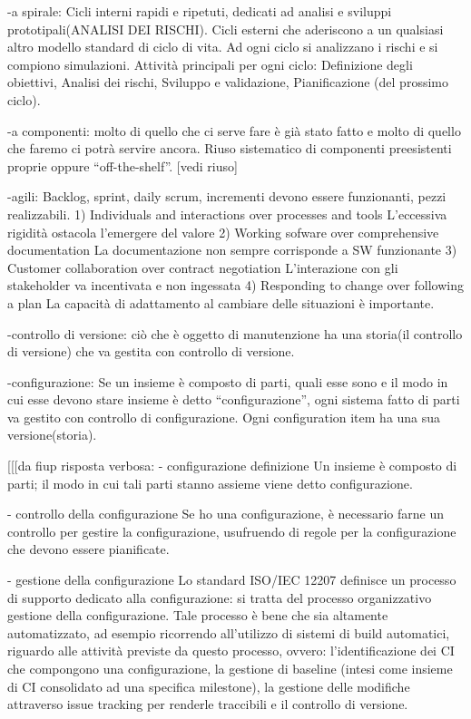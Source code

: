 \documentclass{report}
\begin{document}
-a spirale: Cicli interni rapidi e ripetuti, dedicati ad analisi e sviluppi prototipali(ANALISI DEI RISCHI). Cicli esterni che aderiscono a un qualsiasi altro modello standard di ciclo di vita. Ad ogni ciclo si analizzano i rischi e si compiono simulazioni. 
Attività principali per ogni ciclo: Definizione degli obiettivi, Analisi dei rischi, Sviluppo e validazione, Pianificazione (del prossimo ciclo).

-a componenti: molto di quello che ci serve fare è già stato fatto e molto di quello che faremo ci potrà servire ancora. Riuso sistematico di componenti preesistenti proprie oppure “off-the-shelf”. [vedi riuso]

-agili: Backlog, sprint, daily scrum, incrementi devono essere funzionanti, pezzi realizzabili.
1) Individuals and interactions over processes and tools L’eccessiva rigidità ostacola l’emergere del valore
2) Working sofware over comprehensive documentation La documentazione non sempre corrisponde a SW funzionante
3) Customer collaboration over contract negotiation L’interazione con gli stakeholder va incentivata e non ingessata
4) Responding to change over following a plan La capacità di adattamento al cambiare delle situazioni è importante.

-controllo di versione: ciò che è oggetto di manutenzione ha una storia(il controllo di versione) che va gestita con controllo di versione.

-configurazione: Se un insieme è composto di parti, quali esse sono e il modo in cui esse devono stare insieme è detto “configurazione”,
ogni sistema fatto di parti va gestito con controllo di configurazione. Ogni configuration item ha una sua versione(storia).

[[[da fiup risposta verbosa:
- configurazione
definizione Un insieme è composto di parti; il modo in cui tali parti stanno assieme viene detto configurazione.

- controllo della configurazione
Se ho una configurazione, è necessario farne un controllo per gestire la configurazione, usufruendo di regole per la configurazione che devono essere pianificate.

- gestione della configurazione
Lo standard ISO/IEC 12207 definisce un processo di supporto dedicato alla configurazione: si tratta del processo organizzativo gestione della configurazione.
Tale processo è bene che sia altamente automatizzato, ad esempio ricorrendo all'utilizzo di sistemi di build automatici, riguardo alle attività previste da questo processo, ovvero: l'identificazione dei CI che compongono una configurazione, la gestione di baseline (intesi come insieme di CI consolidato ad una specifica milestone), la gestione delle modifiche attraverso issue tracking per renderle traccibili e il controllo di versione.
\end{document}

